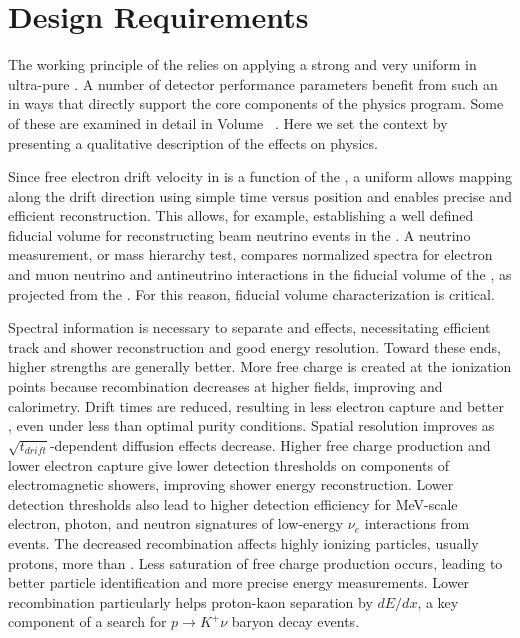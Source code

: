 

\section{Design Requirements}
\label{sec:fddp-hv-des-consid}

The working principle of the  relies on applying a strong and  very uniform  \efield in ultra-pure . A number of detector performance parameters benefit from such an \efield in ways that directly support the core components of the  physics program.  Some of these are examined in detail in  Volume~\volnumberphysics{} \voltitlephysics{}. %
Here we set the context by presenting a qualitative description of the \efield effects on physics.

Since free electron drift velocity in  is a function of the \efield, a uniform \efield allows mapping along the drift direction using simple time versus position and enables precise and efficient \threed reconstruction.  This allows, for example, establishing a well defined fiducial volume for %
reconstructing beam neutrino events in the . A neutrino  %
measurement, or mass hierarchy test, %
compares normalized spectra for electron and muon neutrino and antineutrino interactions in the fiducial volume of the %
, as projected from the . For this reason, fiducial volume characterization is critical.   

Spectral information is necessary to separate  and  effects, necessitating efficient track and shower reconstruction and good energy resolution. Toward these ends, higher \efield strengths are generally better.  More free charge is created at the ionization points because recombination decreases at higher fields, improving  and calorimetry. Drift times are reduced, resulting in less electron capture and better , even under less than optimal purity conditions.  Spatial resolution improves as $\sqrt{t_{drift}}$-dependent diffusion effects decrease. %
Higher free charge production and lower electron capture give lower detection thresholds on components of electromagnetic showers, improving shower energy reconstruction.  Lower detection thresholds also lead to higher detection efficiency for MeV-scale electron, photon, and neutron signatures of low-energy $\nu_e$ interactions from  events.  The decreased recombination affects highly ionizing particles, usually protons, more than . Less saturation of free charge production occurs, leading to better particle identification and more precise energy measurements. Lower recombination particularly helps proton-kaon separation by $dE/dx$, a key component of a search for $p\rightarrow K^+ \nu$ baryon decay events. 

